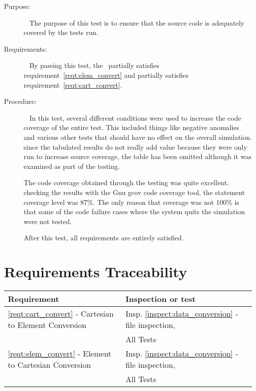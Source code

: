 \label{test:code_coverage}
\begin{description}
\item[Purpose:] \ \newline
The purpose of this test is to ensure that the source code is adequately
covered by the tests run.
\item[Requirements:] \ \newline
By passing this test, the \OrbitalElement\ partially satisfies
requirement~\ref{reqt:elem_convert} and partially satisfies
requirement~\ref{reqt:cart_convert}.
\item[Procedure:]\ \newline
In this test, several different conditions were used to increase the code
coverage of the entire test.  This included things like negative anomalies and
various other tests that should have no effect on the overall simulation.
since the tabulated results do not really add value because they were only
run to increase source coverage, the table has been omitted although it was
examined as part of the testing.

The code coverage obtained through the testing was quite excellent.
checking the results with  the Gnu gcov code coverage tool,
the statement coverage
level was 87\%.  The only reason that coverage was not 100\% is that some of
the code failure cases where the system quits the simulation were not tested.

After this test, all requirements are entirely satisfied.


\end{description}

\section{Requirements Traceability}\label{sec:traceability}

\begin{tabular}{||l|l|l|} \hline
{\bf Requirement} & {\bf Inspection or test} \\ \hline \hline
\ref{reqt:cart_convert} - Cartesian to Element Conversion &
  Insp. \ref{inspect:data_conversion} - file inspection, \\
 & All Tests \\ \hline
\ref{reqt:elem_convert} - Element to Cartesian Conversion &
   Insp. \ref{inspect:data_conversion} - file inspection, \\
 & All Tests \\
\hline
\end{tabular}


